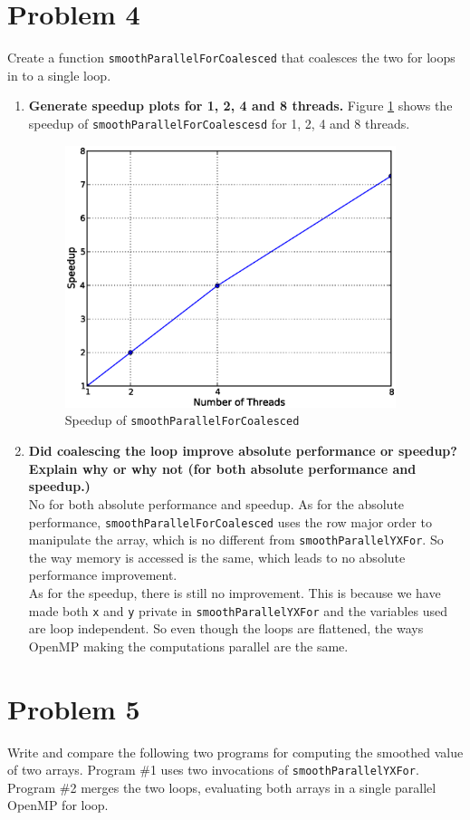 \documentclass[letterpaper, 11pt]{article}
\begin{document}
\section{Problem 4}
Create a function \texttt{smoothParallelForCoalesced} that coalesces the two for loops in to a single loop.
\begin{enumerate}
\item \textbf{Generate speedup plots for 1, 2, 4 and 8 threads.}
Figure \ref{fig:coalesce} shows the speedup of \texttt{smoothParallelForCoalescesd} for 1, 2, 4 and 8 threads.
\begin{figure}[h]
    \centering
    \includegraphics[width=3.8in]{coalesce.eps}
    \caption{Speedup of \texttt{smoothParallelForCoalesced}}
    \label{fig:coalesce}
\end{figure}

\item \textbf{Did coalescing the loop improve absolute performance or speedup? Explain why or why not (for both absolute performance and speedup.)}\\
No for both absolute performance and speedup. As for the absolute performance, \texttt{smoothParallelForCoalesced} uses the row major order to manipulate the array, which is no different from \texttt{smoothParallelYXFor}. So the way memory is accessed is the same, which leads to no absolute performance improvement.\\
As for the speedup, there is still no improvement. This is because we have made both \texttt{x} and \texttt{y} private in \texttt{smoothParallelYXFor} and the variables used are loop independent. So even though the loops are flattened, the ways OpenMP making the computations parallel are the same.
\end{enumerate}

\section{Problem 5}
Write and compare the following two programs for computing the smoothed value of two arrays. Program \#1 uses two invocations of \texttt{smoothParallelYXFor}. Program \#2 merges the two loops, evaluating both arrays in a single parallel OpenMP for loop.
\end{document}
